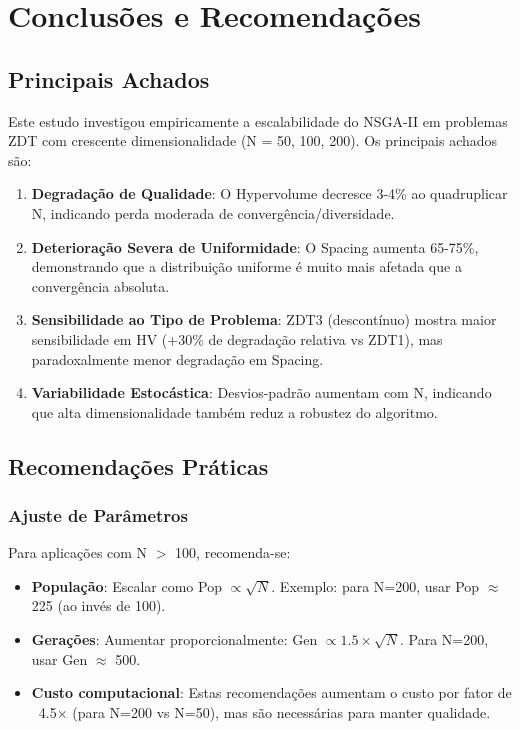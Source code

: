 \section{Conclusões e Recomendações}

\subsection{Principais Achados}
Este estudo investigou empiricamente a escalabilidade do NSGA-II em problemas ZDT com crescente dimensionalidade (N = 50, 100, 200). Os principais achados são:

\begin{enumerate}
  \item \textbf{Degradação de Qualidade}: O Hypervolume decresce 3-4\% ao quadruplicar N, indicando perda moderada de convergência/diversidade.
  
  \item \textbf{Deterioração Severa de Uniformidade}: O Spacing aumenta 65-75\%, demonstrando que a distribuição uniforme é muito mais afetada que a convergência absoluta.
  
  \item \textbf{Sensibilidade ao Tipo de Problema}: ZDT3 (descontínuo) mostra maior sensibilidade em HV (+30\% de degradação relativa vs ZDT1), mas paradoxalmente menor degradação em Spacing.
  
  \item \textbf{Variabilidade Estocástica}: Desvios-padrão aumentam com N, indicando que alta dimensionalidade também reduz a robustez do algoritmo.
\end{enumerate}

\subsection{Recomendações Práticas}

\subsubsection{Ajuste de Parâmetros}
Para aplicações com N $>$ 100, recomenda-se:
\begin{itemize}
  \item \textbf{População}: Escalar como Pop $\propto \sqrt{N}$. Exemplo: para N=200, usar Pop $\approx$ 225 (ao invés de 100).
  
  \item \textbf{Gerações}: Aumentar proporcionalmente: Gen $\propto 1.5 \times \sqrt{N}$. Para N=200, usar Gen $\approx$ 500.
  
  \item \textbf{Custo computacional}: Estas recomendações aumentam o custo por fator de ~4.5× (para N=200 vs N=50), mas são necessárias para manter qualidade.
\end{itemize}


